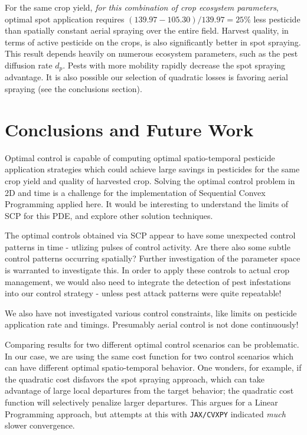 \documentclass[11pt]{article}
\begin{document}
For the same crop yield, \textit{for this combination of crop ecosystem parameters}, optimal spot application requires $(139.97-105.30)/139.97 = 25\%$ less pesticide than spatially constant aerial spraying over the entire field. Harvest quality, in terms of active pesticide on the crops, is also significantly better in spot spraying. This result depends heavily on numerous ecosystem parameters, such as the pest diffusion rate $d_p$. Pests with more mobility rapidly decrease the spot spraying advantage. It is also possible our selection of quadratic losses is favoring aerial spraying (see the conclusions section).

\section{Conclusions and Future Work}

Optimal control is capable of computing optimal spatio-temporal pesticide application strategies which could achieve large savings in pesticides for the same crop yield and quality of harvested crop. Solving the optimal control problem in 2D and time is a challenge for the implementation of Sequential Convex Programming applied here. It would be interesting to understand the limits of SCP for this PDE, and explore other solution techniques.

The optimal controls obtained via SCP appear to have some unexpected control patterns in time - utlizing pulses of control activity. Are there also some subtle control patterns occurring spatially? Further investigation of the parameter space is warranted to investigate this. In order to apply these controls to actual crop management, we would also need to integrate the detection of pest infestations into our control strategy - unless pest attack patterns were quite repeatable!

We also have not investigated various control constraints, like limits on pesticide application rate and timings. Presumably aerial control is not done continuously!

Comparing results for two different optimal control scenarios can be problematic. In our case, we are using the same cost function for two control scenarios which can have different optimal spatio-temporal behavior. One wonders, for example, if the quadratic cost disfavors the spot spraying approach, which can take advantage of large local departures from the target behavior; the quadratic cost function will selectively penalize larger departures. This argues for a Linear Programming approach, but attempts at this with \texttt{JAX/CVXPY} indicated \textit{much} slower convergence.
\end{document}
